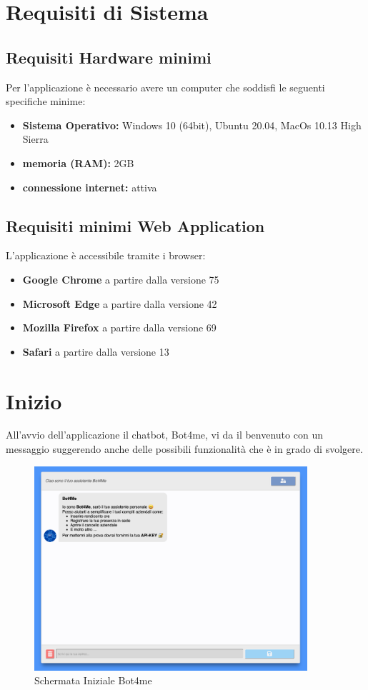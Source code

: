 \section{Requisiti di Sistema}
\subsection{Requisiti Hardware minimi}
Per l'applicazione è necessario avere un computer che soddisfi le seguenti specifiche minime:
\begin{itemize}
    \item \textbf{Sistema Operativo:} Windows 10 (64bit), Ubuntu 20.04, MacOs 10.13 High Sierra
    \item \textbf{memoria (RAM):} 2GB
    \item \textbf{connessione internet:} attiva
\end{itemize}
\subsection{Requisiti minimi Web Application}
L'applicazione è accessibile tramite i browser:
\begin{itemize}
    \item \textbf{Google Chrome} a partire dalla versione 75
    \item \textbf{Microsoft Edge} a partire dalla versione 42
    \item \textbf{Mozilla Firefox} a partire dalla versione 69
    \item \textbf{Safari} a partire dalla versione 13
\end{itemize}

\newpage
\section{Inizio}
All'avvio dell'applicazione il chatbot, Bot4me, vi da il benvenuto con un messaggio suggerendo anche delle possibili funzionalità che è in grado di svolgere. 

\begin{figure}[H]
    \centering\includegraphics[width=0.9\textwidth, height=0.7\textheight, keepaspectratio]{images/schermata_avvio.png}
    \caption{Schermata Iniziale Bot4me}
\end{figure}

